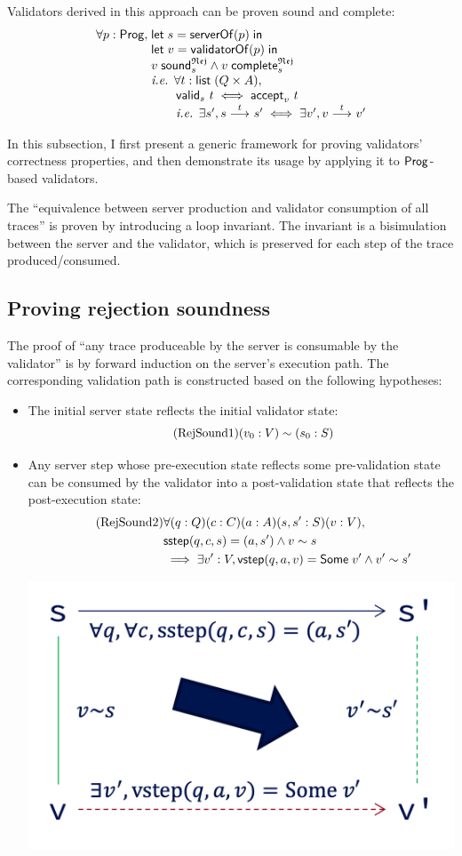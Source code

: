 Validators derived in this approach can be proven sound and complete:
\[\begin{array}{r@{\;}l}
\forall p:\Prog,&\letin{s}{\serverOf(p)}\\
&\letin{v}{\validatorOf(p)}\\
&\rejSound v s\wedge\rejComplete v s\\
&\text{\it i.e. }\forall t:\List(Q\times A),\\
&\qquad\valid s t\iff\accepts v t\\
&\qquad\text{\it i.e. }\exists s',\behaves s t s'\iff\exists v',\behaves v t v'
\end{array}\]

In this subsection, I first present a generic framework for proving validators'
correctness properties, and then demonstrate its usage by applying it to
$\mathsf{Prog}$-based validators.

The ``equivalence between server production and validator consumption of all
traces'' is proven by introducing a loop invariant.  The invariant is a
bisimulation between the server and the validator, which is preserved for each
step of the trace produced/consumed.

\subsection{Proving rejection soundness}
The proof of ``any trace produceable by the server is consumable by the
validator'' is by forward induction on the server's execution path.  The
corresponding validation path is constructed based on the following hypotheses:
\begin{itemize}
\item The initial server state reflects the initial validator state:
  \begin{equation}
    \tag{RejSound1}
    \label{eq:rs1}
    (v_0:V)\sim (s_0:S)
  \end{equation}
\item Any server step whose pre-execution state reflects some pre-validation
  state can be consumed by the validator into a post-validation state that
  reflects the post-execution state:
  \begin{align*}
    \tag{RejSound2}
    \label{eq:rs2}
    &\forall(q:Q)(c:C)(a:A)(s,s':S)(v:V),\\
    &\mathsf{sstep}(q,c,s)=(a,s')\wedge v\sim s\\
    &\implies\exists v':V,\mathsf{vstep}(q,a,v)=\mathsf{Some}\;v'\wedge v'\sim s'
  \end{align*}
  \begin{center}
    \includegraphics[width=.5\textwidth]{figures/sound}
  \end{center}
\end{itemize}


